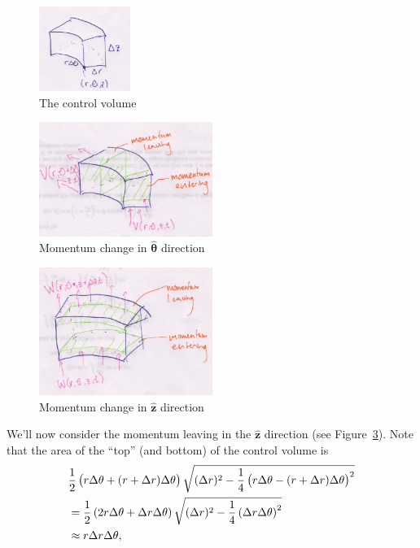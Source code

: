 \documentclass{article}
\newcommand{\thetahat}{\boldsymbol{\hat{\theta}}}
\newcommand{\zhat}{\mathbf{\hat{z}}}
\begin{document}
%
\begin{figure}[b]
    \includegraphics[width=8em]{d-cv}
    \centering
    \caption{The control volume}
    \label{figure:d-cv}
\end{figure}
%
\begin{figure}[!ht]
    \includegraphics[width=15.2em]{d-theta}
    \centering
    \caption{Momentum change in $\thetahat$ direction}
    \label{figure:d-theta}
\end{figure}
%
\begin{figure}[!ht]
    \includegraphics[width=15.2em]{d-z}
    \centering
    \caption{Momentum change in $\zhat$ direction}
    \label{figure:d-z}
\end{figure}
%
We'll now consider the momentum leaving in the $\zhat$ direction (see
Figure~\ref{figure:d-z}). Note that the area of the ``top'' (and bottom) of the control
volume is
%
\begin{align*}
    &\frac{1}{2}
    \del{r \Delta \theta + (r + \Delta r) \Delta \theta}
    \sqrt{(\Delta r)^2 - \frac{1}{4}
        \del{r \Delta \theta - (r + \Delta r) \Delta \theta}^2
    } \\
    &=
    \frac{1}{2}
    \del{2 r \Delta \theta + \Delta r \Delta \theta}
    \sqrt{(\Delta r)^2 - \frac{1}{4}
        \del{\Delta r \Delta \theta}^2
    } \\
    &\approx r \Delta r \Delta \theta
    ,
\end{align*}
\end{document}

